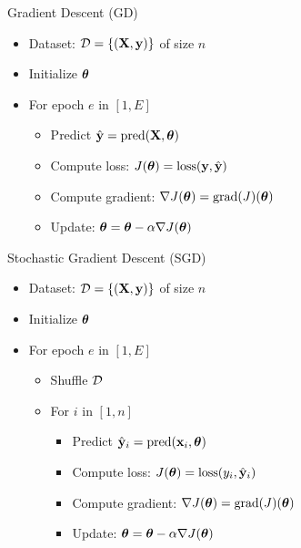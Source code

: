 \documentclass[usenames,dvipsnames]{beamer}
\begin{document}
                        \begin{frame}{Gradient Descent (GD)}
                        \begin{itemize}
                            \item Dataset: $\mathcal{D} = \{(\mathbf{X}, \mathbf{y})\}$ of size $n$
                            \item Initialize $\boldsymbol{\theta}$
                            \item For epoch $e$ in $[1, E]$
                            \begin{itemize}
                                \item Predict $\hat{\mathbf{y}} = \text{pred}(\mathbf{X}, \boldsymbol{\theta})$
                                \item Compute loss: $J(\boldsymbol{\theta}) = \text{loss}(\mathbf{y}, \hat{\mathbf{y}})$
                                \item Compute gradient: $\nabla J(\boldsymbol{\theta}) = \text{grad}(J)(\boldsymbol{\theta})$
                                \item Update: $\boldsymbol{\theta} = \boldsymbol{\theta} - \alpha \nabla J(\boldsymbol{\theta})$
                            \end{itemize}
                        \end{itemize}
                    \end{frame}
                    
                    \begin{frame}{Stochastic Gradient Descent (SGD)}
                        \begin{itemize}
                            \item Dataset: $\mathcal{D} = \{(\mathbf{X}, \mathbf{y})\}$ of size $n$
                            \item Initialize $\boldsymbol{\theta}$
                            \item For epoch $e$ in $[1, E]$
                            \begin{itemize}
                                \item Shuffle $\mathcal{D}$
                                \item For $i$ in $[1, n]$
                                \begin{itemize}
                                    \item Predict $\hat{\mathbf{y}}_i = \text{pred}(\mathbf{x}_i, \boldsymbol{\theta})$
                                    \item Compute loss: $J(\boldsymbol{\theta}) = \text{loss}(y_i, \hat{\mathbf{y}}_i)$
                                    \item Compute gradient: $\nabla J(\boldsymbol{\theta}) = \text{grad}(J)(\boldsymbol{\theta})$
                                    \item Update: $\boldsymbol{\theta} = \boldsymbol{\theta} - \alpha \nabla J(\boldsymbol{\theta})$
                                \end{itemize}
                            \end{itemize}
                        \end{itemize}
                    \end{frame}
                    
\end{document}
